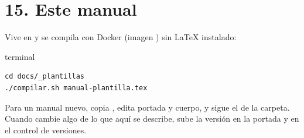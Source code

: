 \documentclass[11pt]{article}
\begin{document}
\section{15. Este manual}
Vive en  y se compila con Docker (imagen ) sin LaTeX instalado:
\begin{termbox}{terminal}
\begin{lstlisting}[style=plain]
cd docs/_plantillas
./compilar.sh manual-plantilla.tex
\end{lstlisting}
\end{termbox}
Para un manual nuevo, copia , edita portada y cuerpo, y sigue el  de la carpeta. Cuando cambie algo de lo que aqu\'i se describe, sube la versi\'on en la portada y en el control de versiones.
\end{document}
